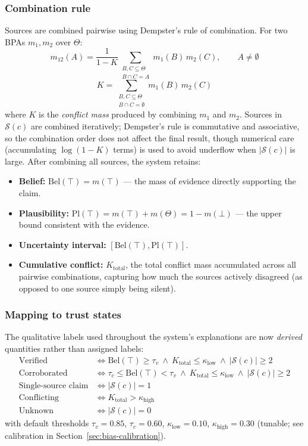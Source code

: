 \documentclass[11pt]{article}
\begin{document}
\subsubsection{Combination rule}
Sources are combined pairwise using Dempster's rule of combination. For two BPAs $m_1, m_2$ over $\Theta$:
\begin{equation}
m_{12}(A) = \frac{1}{1-K}\sum_{\substack{B,C \subseteq \Theta \\ B \cap C = A}} m_1(B)\,m_2(C), \qquad A \neq \emptyset
\end{equation}
\begin{equation}
K = \sum_{\substack{B,C \subseteq \Theta \\ B \cap C = \emptyset}} m_1(B)\,m_2(C)
\end{equation}
where $K$ is the \emph{conflict mass} produced by combining $m_1$ and $m_2$. Sources in $\mathcal{S}(c)$
are combined iteratively; Dempster's rule is commutative and associative, so the combination order does
not affect the final result, though numerical care (accumulating $\log(1-K)$ terms) is used to avoid
underflow when $|\mathcal{S}(c)|$ is large. After combining all sources, the system retains:
\begin{itemize}[leftmargin=*]
\item \textbf{Belief:} $\mathrm{Bel}(\top) = m(\top)$ --- the mass of evidence directly supporting the claim.
\item \textbf{Plausibility:} $\mathrm{Pl}(\top) = m(\top) + m(\Theta) = 1 - m(\bot)$ --- the upper bound
consistent with the evidence.
\item \textbf{Uncertainty interval:} $[\mathrm{Bel}(\top), \mathrm{Pl}(\top)]$.
\item \textbf{Cumulative conflict:} $K_{\text{total}}$, the total conflict mass accumulated across all
pairwise combinations, capturing how much the sources actively disagreed (as opposed to one source simply
being silent).
\end{itemize}

\subsubsection{Mapping to trust states}
The qualitative labels used throughout the system's explanations are now \emph{derived} quantities rather
than assigned labels:
\begin{align}
\text{Verified} &\iff \mathrm{Bel}(\top) \geq \tau_v \ \wedge\ K_{\text{total}} \leq \kappa_{\text{low}} \ \wedge\ |\mathcal{S}(c)| \geq 2 \\
\text{Corroborated} &\iff \tau_c \leq \mathrm{Bel}(\top) < \tau_v \ \wedge\ K_{\text{total}} \leq \kappa_{\text{low}} \ \wedge\ |\mathcal{S}(c)| \geq 2 \\
\text{Single-source claim} &\iff |\mathcal{S}(c)| = 1 \\
\text{Conflicting} &\iff K_{\text{total}} > \kappa_{\text{high}} \\
\text{Unknown} &\iff |\mathcal{S}(c)| = 0
\end{align}
with default thresholds $\tau_v = 0.85$, $\tau_c = 0.60$, $\kappa_{\text{low}} = 0.10$,
$\kappa_{\text{high}} = 0.30$ (tunable; see calibration in Section~\ref{sec:bias-calibration}).
\end{document}
